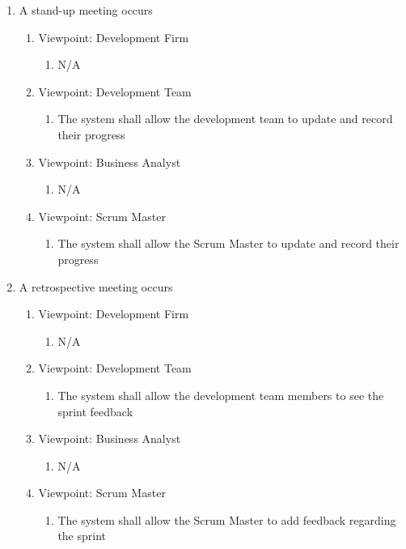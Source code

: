 \documentclass[12pt, titlepage]{article}
\begin{document}
\begin{enumerate}[{BE}1.]
	\item A stand-up meeting occurs     %
	\begin{enumerate}[{VP}1.] 
	    \item Viewpoint: Development Firm
	        \begin{enumerate}
	            \item[] N/A
	        \end{enumerate}
	    \item Viewpoint: Development Team
	        \begin{enumerate}
	            \item The system shall allow the development team to update and record their progress
	        \end{enumerate}
		\item Viewpoint: Business Analyst
			\begin{enumerate}
			    \item[] N/A
			\end{enumerate}
		\item Viewpoint: Scrum Master
			\begin{enumerate}
			    \item The system shall allow the Scrum Master to update and record their progress
			\end{enumerate}
	\end{enumerate}

    \item A retrospective meeting occurs     %
	\begin{enumerate}[{VP}1.] 
	    \item Viewpoint: Development Firm
	        \begin{enumerate}
	            \item[] N/A
	        \end{enumerate}
	    \item Viewpoint: Development Team
	        \begin{enumerate}
	            \item The system shall allow the development team members to see the sprint feedback
	        \end{enumerate}
		\item Viewpoint: Business Analyst
			\begin{enumerate}
			    \item[] N/A
			\end{enumerate}
		\item Viewpoint: Scrum Master
			\begin{enumerate}
			    \item The system shall allow the Scrum Master to add feedback regarding the sprint
			\end{enumerate}
	\end{enumerate}
	

\end{enumerate}
\end{document}
